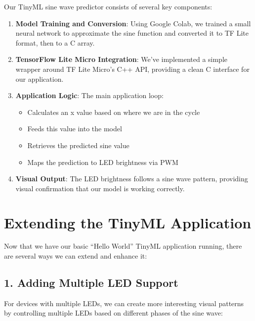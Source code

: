 \documentclass[
  9pt,
  letterpaper,
  abstract,
  titlepage]{scrbook}
\providecommand{\tightlist}{%
  \setlength{\itemsep}{0pt}\setlength{\parskip}{0pt}}\usepackage{longtable,booktabs,array}
\def\tightlist{}
\let\tightlist\relax
\begin{document}
Our TinyML sine wave predictor consists of several key components:

\begin{enumerate}
\def\labelenumi{\arabic{enumi}.}
\item
  \textbf{Model Training and Conversion}: Using Google Colab, we trained
  a small neural network to approximate the sine function and converted
  it to TF Lite format, then to a C array.
\item
  \textbf{TensorFlow Lite Micro Integration}: We've implemented a simple
  wrapper around TF Lite Micro's C++ API, providing a clean C interface
  for our application.
\item
  \textbf{Application Logic}: The main application loop:

  \begin{itemize}
  \tightlist
  \item
    Calculates an x value based on where we are in the cycle
  \item
    Feeds this value into the model
  \item
    Retrieves the predicted sine value
  \item
    Maps the prediction to LED brightness via PWM
  \end{itemize}
\item
  \textbf{Visual Output}: The LED brightness follows a sine wave
  pattern, providing visual confirmation that our model is working
  correctly.
\end{enumerate}

\section{Extending the TinyML
Application}\label{extending-the-tinyml-application}

Now that we have our basic ``Hello World'' TinyML application running,
there are several ways we can extend and enhance it:

\subsection{1. Adding Multiple LED
Support}\label{adding-multiple-led-support}

For devices with multiple LEDs, we can create more interesting visual
patterns by controlling multiple LEDs based on different phases of the
sine wave:
\end{document}
